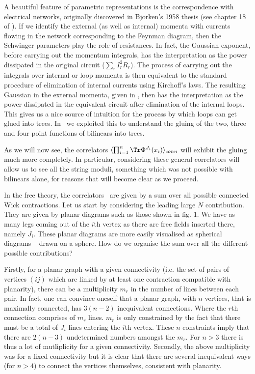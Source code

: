 A beautiful feature of parametric representations is the
correspondence with electrical networks, originally discovered in
Bjorken's 1958 thesis (see chapter 18 of \BD ). If we identify the
external (as well as internal) momenta with currents flowing in
the network corresponding to the Feynman diagram, then the
Schwinger parameters play the role of resistances. In fact, the
Gaussian exponent, before carrying out the momentum integrals, has
the interpretation as the power dissipated in the original circuit
($\sum_r I_r^2R_r$). The process of carrying out the integrals
over internal or loop momenta is then equivalent to the standard
procedure of elimination of internal currents using Kirchoff's
laws. The resulting Gaussian in the external momenta, given in
\gauss , then has the interpretation as the power dissipated  in
the equivalent circuit after elimination of the internal loops.
This gives us a nice source of intuition for the process by which
loops can get glued into trees. In \ff\ we exploited this to
understand the gluing of the two, three and four point functions
of bilinears into trees.

As we will now see, the correlators $\la \prod_{i=1}^n \Tr\Phi^{J_i}(x_i)\ra_{conn}$
will exhibit the gluing much more completely. In particular,
considering these general correlators will allow us to see all the string moduli,
something which was not possible with bilinears alone, for reasons that
will become clear as we proceed.


In the free theory, the correlators \ncorr\ are given by a
sum over all possible connected Wick contractions. Let us start by
considering the leading large $N$ contribution. They are given by
planar diagrams such as those shown in fig. 1. We have as
many legs coming out of the $i$th vertex as there are free fields
inserted there, namely $J_i$. These planar diagrams are more
easily visualised as spherical diagrams -- drawn on a sphere. How
do we organise the sum over all the different possible
contributions?

Firstly, for a planar graph with
a given connectivity (i.e. the set of pairs of 
vertices $(ij)$ which are linked by at least one 
contraction compatible with planarity),
there can be a multiplicity $m_r$ in the number of lines between each pair.
In fact, one can convince oneself that a planar graph, with $n$ vertices, 
that is maximally connected,
has $3(n-2)$ inequivalent connections. Where the $r$th connection comprises
of $m_r$ lines. $m_r$ is
only constrained by the fact that there must be a total of $J_i$ lines entering
the $i$th vertex. These $n$ constraints imply that there are $2(n-3)$ undetermined
numbers amongst the $m_r$. 
For $n>3$ there is thus a lot of mutliplicity for a
given connectivity.
Secondly, the above multiplicity was for
a fixed connectivity but
it is clear that there are several inequivalent ways (for $n>4$)
to connect the vertices themselves, consistent with planarity.

